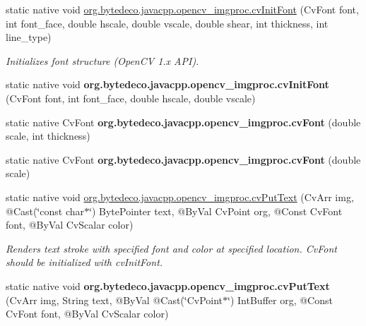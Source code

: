 \begin{DoxyCompactItemize}
\item 
static native void \hyperlink{group__imgproc__c_ga7802f35f4ff9683ba622d633d5b17a25}{org.\+bytedeco.\+javacpp.\+opencv\+\_\+imgproc.\+cv\+Init\+Font} (Cv\+Font font, int font\+\_\+face, double hscale, double vscale, double shear, int thickness, int line\+\_\+type)
\begin{DoxyCompactList}\small\item\em Initializes font structure (Open\+CV 1.\+x A\+PI). \end{DoxyCompactList}\item 
\mbox{\label{group__imgproc__c_gae01e24a910194852d21c1a06f6d8da57}} 
static native void {\bfseries org.\+bytedeco.\+javacpp.\+opencv\+\_\+imgproc.\+cv\+Init\+Font} (Cv\+Font font, int font\+\_\+face, double hscale, double vscale)
\item 
\mbox{\label{group__imgproc__c_gabd35098d26d989c413244e42f2df56cb}} 
static native Cv\+Font {\bfseries org.\+bytedeco.\+javacpp.\+opencv\+\_\+imgproc.\+cv\+Font} (double scale, int thickness)
\item 
\mbox{\label{group__imgproc__c_gaeb467c98164d58ffcfc4b90334e5ab81}} 
static native Cv\+Font {\bfseries org.\+bytedeco.\+javacpp.\+opencv\+\_\+imgproc.\+cv\+Font} (double scale)
\item 
static native void \hyperlink{group__imgproc__c_gaa0527c4e076b98ec48324b7585ca98df}{org.\+bytedeco.\+javacpp.\+opencv\+\_\+imgproc.\+cv\+Put\+Text} (Cv\+Arr img, @Cast(\char`\"{}const char$\ast$\char`\"{}) Byte\+Pointer text, @By\+Val Cv\+Point org, @Const Cv\+Font font, @By\+Val Cv\+Scalar color)
\begin{DoxyCompactList}\small\item\em Renders text stroke with specified font and color at specified location. Cv\+Font should be initialized with cv\+Init\+Font. \end{DoxyCompactList}\item 
\mbox{\label{group__imgproc__c_ga01518e816a1247f37c0658259b598581}} 
static native void {\bfseries org.\+bytedeco.\+javacpp.\+opencv\+\_\+imgproc.\+cv\+Put\+Text} (Cv\+Arr img, String text, @By\+Val @Cast(\char`\"{}Cv\+Point$\ast$\char`\"{}) Int\+Buffer org, @Const Cv\+Font font, @By\+Val Cv\+Scalar color)
\item 
\mbox{\label{group__imgproc__c_gafaa7fe81e5fc8188cec75426b231f629}} 

\end{DoxyCompactItemize}

